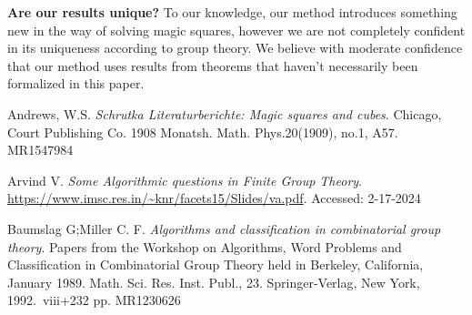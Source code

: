 \documentclass{rhumj_new}
\begin{document}
\textbf{Are our results unique?} To our knowledge, our method introduces something new in the way
of solving magic squares, however we are not completely confident in its uniqueness according to
group theory. We believe with moderate confidence that our method uses results from theorems that
haven't necessarily been formalized in this paper.


\begin{thebibliography}{10}

  Andrews, W.S. {\it Schrutka
      Literaturberichte: Magic squares and cubes}.
  Chicago, Court Publishing Co. 1908
  Monatsh. Math. Phys.20(1909), no.1, A57.
  MR1547984

  Arvind V.
    {\it Some Algorithmic questions in Finite Group Theory}.
  \url{https://www.imsc.res.in/~knr/facets15/Slides/va.pdf}.
  Accessed: 2-17-2024

  Baumslag G;\@ Miller C. F.
    {\it Algorithms and classification in combinatorial group theory}.
  Papers from the Workshop on Algorithms, Word Problems and Classification in Combinatorial
  Group Theory held in Berkeley, California, January 1989.
  Math. Sci. Res. Inst. Publ., 23.
  Springer-Verlag, New York, 1992.\ viii+232 pp.
  MR1230626



\end{thebibliography}
\end{document}

